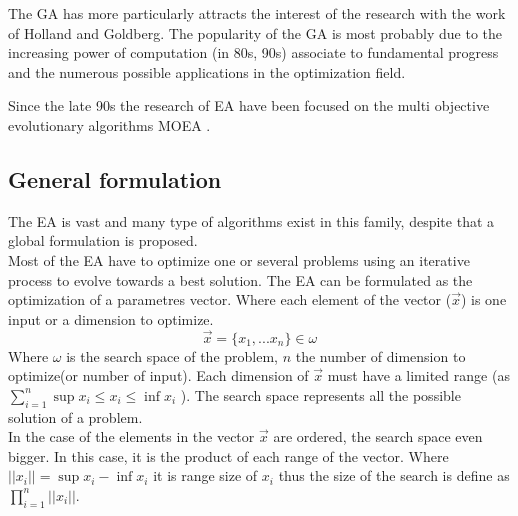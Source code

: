 The GA has more particularly attracts the interest of the research with the work of Holland and  Goldberg. The popularity of the GA is most probably due to the increasing power of computation (in 80s, 90s) associate to fundamental progress and the numerous possible applications in the optimization field.

Since the late 90s the research of EA have been focused on the multi objective evolutionary algorithms MOEA   \cite{75*zhou2011, 114*Zhang2007, 140*soremekun2001}. %



 


\subsection{General formulation}\label{sec:GeneralEAform}

 The EA is vast and many type of algorithms exist in this family, despite that a global formulation is proposed.\\
 Most of the EA have to optimize one or several problems using an iterative process to evolve towards a best solution. The EA can be formulated as the optimization of a parametres vector. Where each element of the vector ($\vec{x}$) is one input or a dimension to optimize. \begin{equation}
	\vec{x}= \{x_1,...x_n \} \in \omega
\end{equation}
Where $\omega$ is the search space of the problem, $n$ the number of dimension to optimize(or number of input). Each dimension of $\vec{x}$ must have a limited range (as $ \sum^{n}_{i=1} \sup x_i \leq x_i \leq \inf x_i$ ).  The search space represents all the possible solution of a problem. \\
In the case of the elements in the vector $\vec{x}$ are ordered, the search space even bigger. In this case, it is the product of each range of the vector.%
Where $||x_i||=\sup x_i -\inf x_i $ it is range size of  $x_i$ thus the size of the search is define as  $ \prod_{i=1}^{n} ||x_i||$. \\

